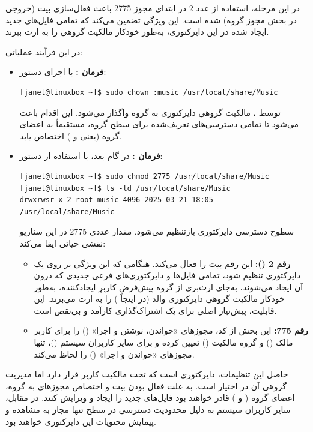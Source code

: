 در این مرحله، استفاده از عدد 2 در ابتدای مجوز 2775 باعث فعال‌سازی بیت  (خروجی  در بخش مجوز گروه) شده است. این ویژگی تضمین می‌کند که تمامی فایل‌های جدید ایجاد شده در این دایرکتوری، به‌طور خودکار مالکیت گروهی  را به ارث ببرند.

در این فرآیند عملیاتی:

\begin{itemize}
  \item \textbf{فرمان :} با اجرای دستور:
\begin{latin}
\begin{lstlisting}
[janet@linuxbox ~]$ sudo chown :music /usr/local/share/Music
\end{lstlisting}
\end{latin}
توسط ، مالکیت گروهی دایرکتوری به گروه  واگذار می‌شود. این اقدام باعث می‌شود تا تمامی دسترسی‌های تعریف‌شده برای سطح گروه، مستقیماً به اعضای گروه  (یعنی  و ) اختصاص یابد.

  \item \textbf{فرمان :} در گام بعد، با استفاده از دستور:
\begin{latin}
\begin{lstlisting}
[janet@linuxbox ~]$ sudo chmod 2775 /usr/local/share/Music
[janet@linuxbox ~]$ ls -ld /usr/local/share/Music
drwxrwsr-x 2 root music 4096 2025-03-21 18:05 /usr/local/share/Music
\end{lstlisting}
\end{latin}
سطوح دسترسی دایرکتوری بازتنظیم می‌شود. مقدار عددی 2775 در این سناریو نقشی حیاتی ایفا می‌کند:
\begin{itemize}
  \item \textbf{رقم 2 ():} این رقم بیت  را فعال می‌کند. هنگامی که این ویژگی بر روی یک دایرکتوری تنظیم شود، تمامی فایل‌ها و دایرکتوری‌های فرعی جدیدی که درون آن ایجاد می‌شوند، به‌جای ارث‌بری از گروه پیش‌فرضِ کاربرِ ایجادکننده، به‌طور خودکار مالکیت گروهی دایرکتوری والد (در اینجا ) را به ارث می‌برند. این قابلیت، پیش‌نیاز اصلی برای یک اشتراک‌گذاری کارآمد و بی‌نقص است.
  \item \textbf{رقم 775:} این بخش از کد، مجوزهای «خواندن، نوشتن و اجرا» () را برای کاربر مالک () و گروه مالکیت () تعیین کرده و برای سایر کاربران سیستم ()، تنها مجوزهای «خواندن و اجرا» () را لحاظ می‌کند.
\end{itemize}
\end{itemize}

حاصل این تنظیمات، دایرکتوری  است که تحت مالکیت کاربر  قرار دارد اما مدیریت گروهی آن در اختیار  است. به علت فعال بودن بیت  و اختصاص مجوزهای  به گروه، اعضای گروه  ( و ) قادر خواهند بود فایل‌های جدید را ایجاد و ویرایش کنند. در مقابل، سایر کاربران سیستم به دلیل محدودیت دسترسی در سطح  تنها مجاز به مشاهده و پیمایش محتویات این دایرکتوری خواهند بود.

